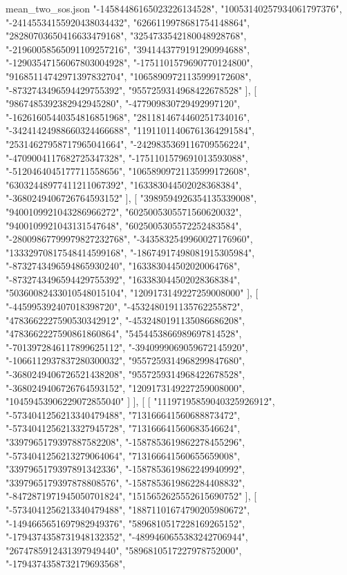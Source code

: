 \begin{filecontents*}[overwrite]{mean_two_sos.json}
    "-14584486165023226134528",
    "10053140257934061797376",
    "-24145534155920438034432",
    "6266119978681754148864",
    "28280703650416633479168",
    "3254733542180048928768",
    "-21960058565091109257216",
    "3941443779191290994688",
    "-12903547156067803004928",
    "-1751101579690770124800",
    "91685114742971397832704",
    "10658909721135999172608",
    "-8732743496594429755392",
    "9557259314968422678528"
   ],
   [
    "9867485392382942945280",
    "-477909830729492997120",
    "-16261605440354816851968",
    "2811814674460251734016",
    "-34241424988660324466688",
    "11911011406761364291584",
    "25314627958717965041664",
    "-2429835369116709556224",
    "-4709004117682725347328",
    "-1751101579691013593088",
    "-5120464045177711558656",
    "10658909721135999172608",
    "63032448977411211067392",
    "163383044502028368384",
    "-3680249406726764593152"
   ],
   [
    "3989594926354135339008",
    "9400109921043286966272",
    "6025005305571560620032",
    "9400109921043131547648",
    "6025005305572252483584",
    "-28009867799979827232768",
    "-3435832549960027176960",
    "13332970817548414599168",
    "-18674917498081915305984",
    "-8732743496594865930240",
    "163383044502020064768",
    "-8732743496594429755392",
    "163383044502028368384",
    "50360082433010548015104",
    "1209173149227259008000"
   ],
   [
    "-445995392407018398720",
    "-4532480191135762255872",
    "4783662227590530342912",
    "-4532480191135086686208",
    "4783662227590861860864",
    "5454453866989697814528",
    "-7013972846117899625112",
    "-3940999069059672145920",
    "-1066112937837280300032",
    "9557259314968299847680",
    "-3680249406726521438208",
    "9557259314968422678528",
    "-3680249406726764593152",
    "1209173149227259008000",
    "10459453906229072855040"
   ]
  ],
  [
   [
    "11197195859040325926912",
    "-5734041256213340479488",
    "713166641560688873472",
    "-5734041256213327945728",
    "713166641560683546624",
    "3397965179397887582208",
    "-1587853619862278455296",
    "-5734041256213279064064",
    "713166641560655659008",
    "3397965179397891342336",
    "-1587853619862249940992",
    "3397965179397878808576",
    "-1587853619862284408832",
    "-8472871971945050701824",
    "1515652625552615690752"
   ],
   [
    "-5734041256213340479488",
    "18871101674790205980672",
    "-1494665651697982949376",
    "5896810517228169265152",
    "-1794374358731948132352",
    "-4899460655383242706944",
    "2674785912431397949440",
    "5896810517227978752000",
    "-1794374358732179693568",

\end{filecontents*}
